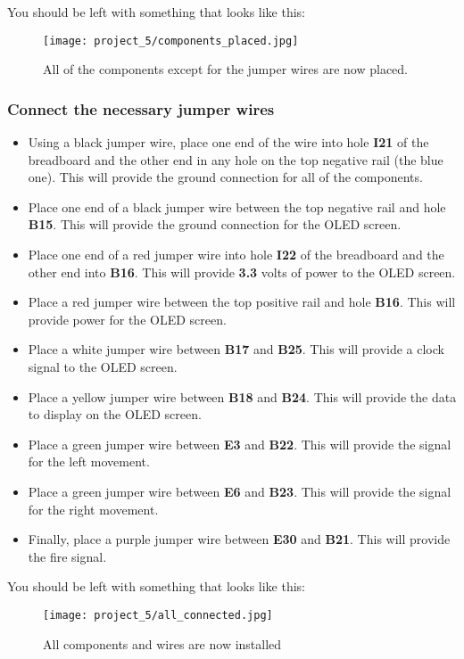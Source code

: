 You should be left with something that looks like this:
\begin{figure}[H]
    \centering
    \texttt{[image: project\_5/components\_placed.jpg]}
    \caption{All of the components except for the jumper wires are now placed.}
\end{figure}

\subsubsection{Connect the necessary jumper wires}
\begin{itemize}
    \item Using a black jumper wire, place one end of the wire into hole \textbf{I21} of the breadboard and the other
    end in any hole on the top negative rail (the blue one). This will provide the ground connection for all of the components.
    \item Place one end of a black jumper wire between the top negative rail and hole \textbf{B15}. This will provide the ground connection
    for the OLED screen.
    \item Place one end of a red jumper wire into hole \textbf{I22} of the breadboard and the other end into
    \textbf{B16}. This will provide \textbf{3.3} volts of power to the OLED screen.
    \item Place a red jumper wire between the top positive rail and hole \textbf{B16}. This will provide power for the OLED screen.
    \item Place a white jumper wire between \textbf{B17} and \textbf{B25}. This will provide a clock signal to the OLED screen.
    \item Place a yellow jumper wire between \textbf{B18} and \textbf{B24}. This will provide the data to display on the OLED screen.
    \item Place a green jumper wire between \textbf{E3} and \textbf{B22}. This will provide the signal for the left movement.
    \item Place a green jumper wire between \textbf{E6} and \textbf{B23}. This will provide the signal for the right movement.
    \item Finally, place a purple jumper wire between \textbf{E30} and \textbf{B21}. This will provide the fire signal.
\end{itemize}

You should be left with something that looks like this:
\begin{figure}[H]
    \centering
    \texttt{[image: project\_5/all\_connected.jpg]}
    \caption{All components and wires are now installed}
\end{figure}

